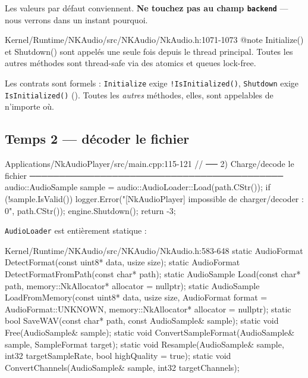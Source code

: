 Les valeurs par défaut conviennent. \textbf{Ne touchez pas au champ
\texttt{backend}} — nous verrons dans un instant pourquoi.

\begin{nkretenir}
\begin{nkcode}{Kernel/Runtime/NKAudio/src/NKAudio/NkAudio.h:1071-1073}
 @note Initialize() et Shutdown() sont appelés une seule fois
       depuis le thread principal. Toutes les autres méthodes
       sont thread-safe via des atomics et queues lock-free.
\end{nkcode}
Les contrats sont formels : \texttt{Initialize} exige
\texttt{!IsInitialized()}, \texttt{Shutdown} exige \texttt{IsInitialized()}
(). Toutes les \emph{autres} méthodes, elles, sont
appelables de n'importe où.
\end{nkretenir}

\subsection{Temps 2 — décoder le fichier}

\begin{nkcode}{Applications/NkAudioPlayer/src/main.cpp:115-121}
    // ── 2) Charge/decode le fichier ───────────────────────────────────────────
    audio::AudioSample sample = audio::AudioLoader::Load(path.CStr());
    if (!sample.IsValid()) {
        logger.Error("[NkAudioPlayer] impossible de charger/decoder : {0}", path.CStr());
        engine.Shutdown();
        return -3;
    }
\end{nkcode}

\texttt{AudioLoader} est entièrement statique :

\begin{nkcode}{Kernel/Runtime/NKAudio/src/NKAudio/NkAudio.h:583-648}
static AudioFormat DetectFormat(const uint8* data, usize size);
static AudioFormat DetectFormatFromPath(const char* path);
static AudioSample Load(const char* path, memory::NkAllocator* allocator = nullptr);
static AudioSample LoadFromMemory(const uint8* data, usize size,
                                  AudioFormat format = AudioFormat::UNKNOWN,
                                  memory::NkAllocator* allocator = nullptr);
static bool SaveWAV(const char* path, const AudioSample& sample);
static void Free(AudioSample& sample);
static void ConvertSampleFormat(AudioSample& sample, SampleFormat target);
static void Resample(AudioSample& sample, int32 targetSampleRate, bool highQuality = true);
static void ConvertChannels(AudioSample& sample, int32 targetChannels);
\end{nkcode}

